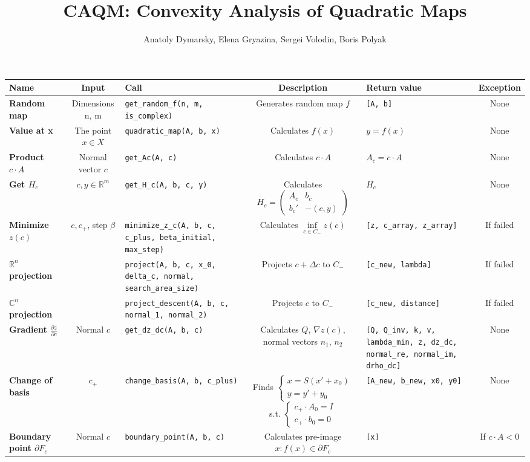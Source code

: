 \documentclass[a4paper]{article}
\title{CAQM: Convexity Analysis of Quadratic Maps}
\date{}
\author{Anatoly Dymarsky, Elena Gryazina, Sergei Volodin, Boris Polyak}
\newcommand{\R}{\mathbb{R}}
\begin{document}
\maketitle
\begin{tabular}{|p{28mm}|c|p{50mm}|c|p{30mm}|c|}
	\hline
	\bf Name & \bf Input & \bf Call & \bf Description & \bf Return value & \bf Exception\\\hline
	\bf Random map & {Dimensions n, m} & {\tt get\_random\_f(n, m, is\_complex)} & Generates random map $f$ & {\tt [A, b]} & None\\\hline
	\bf Value at x & The point $x\in X$ & {\tt quadratic\_map(A, b, x)} & Calculates $f(x)$ & $y=f(x)$ & None\\\hline
	\bf Product $c\cdot A$ & Normal vector $c$ & {\tt get\_Ac(A, c)} & Calculates $c\cdot A$ & $A_c=c\cdot A$ & None\\\hline
	\bf Get $H_c$ & $c,y\in\R^m$ & {\tt get\_H\_c(A, b, c, y)} & Calculates $H_c=\left(\begin{array}{cc}A_c & b_c\\b_c' &-(c,y) \end{array}\right)$ & $H_c$ & None\\\hline
	\bf Minimize $z(c)$ & $c,c_+$, step $\beta$ & {\tt minimize\_z\_c(A, b, c, c\_plus, beta\_initial, max\_step)} & Calculates $\inf\limits_{c\in C_-}z(c)$ & {\tt [z, c\_array, z\_array]} & If failed\\\hline
	\bf  $\R^n$ projection & & {\tt project(A, b, c, x\_0, delta\_c, normal, search\_area\_size)} & Projects $c+\Delta c$ to $C_-$ & {\tt [c\_new, lambda]} & If failed\\\hline
	\bf $\mathbb{C}^n$ projection & & {\tt project\_descent(A, b, c, normal\_1, normal\_2)} & Projects $c$ to $C_-$ & {\tt [c\_new, distance]} & If failed\\\hline
	\bf Gradient $\frac{\partial z}{\partial c}$ & Normal $c$ & {\tt get\_dz\_dc(A, b, c)} & Calculates $Q$, $\nabla z(c)$, normal vectors $n_1$, $n_2$ & {\tt [Q, Q\_inv, k, v, lambda\_min, z, dz\_dc, normal\_re, normal\_im, drho\_dc]} & None\\\hline
	\bf Change of basis & $c_+$ & {\tt change\_basis(A, b, c\_plus)} & Finds $\begin{cases}
	x = S(x'+x_0)\\
	y = y' + y_0
	\end{cases}
	$ s.t.
	$\begin{cases}
	c_+\cdot A_0=I\\
	c_+\cdot b_0=0
	\end{cases}$ & {\tt [A\_new, b\_new, x0, y0]} & None\\\hline
	\bf Boundary point $\partial F_c$ & Normal $c$ & {\tt boundary\_point(A, b, c)} & Calculates pre-image $x\colon f(x)\in\partial F_c$ & {\tt [x]} & If $c\cdot A<0$\\\hline
\end{tabular}
\end{document}
